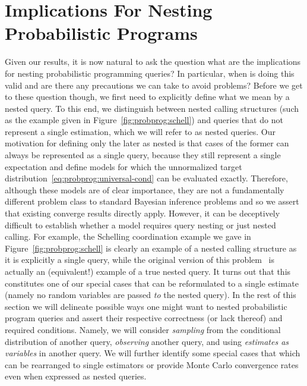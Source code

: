
\section{Implications For Nesting Probabilistic Programs}
\label{sec:nest:imp}

Given our results, it is now natural to ask the question what are the implications
for nesting probabilistic programming queries?  In particular, when is doing
this valid and are there any precautions we can take to avoid problems?  Before
we get to these question though, we first need to explicitly define what we
mean by a nested query.  To this end, we distinguish between nested calling
structures (such as the example given in Figure~\ref{fig:probprog:schell}) and
queries that do not represent a single estimation, which we will refer
to as nested queries. Our motivation for defining only the later
as nested is that cases of the former can always be represented as a single
query, because they still represent a single expectation and define models
for which the unnormalized target distribution~\eqref{eq:probprog:universal-cond}
 can be evaluated exactly.  Therefore, although these models are
of clear importance, they are not a fundamentally different problem class
to standard Bayesian inference problems and so we assert that existing \mc
converge results directly apply.  However, it can be deceptively difficult to establish
whether a model requires query nesting or just nested calling.
For example, the Schelling coordination example we gave in Figure~\ref{fig:probprog:schell}
is clearly an example of a nested calling structure as it is explicitly a single query,
while the original version of this problem~\cite[Figure 6]{stuhlmuller2014reasoning}
is actually an (equivalent!) example of a true nested query.  It turns out that this
constitutes one of our special cases that can be reformulated to a single estimate (namely
no random variables are passed \emph{to} the nested query).
In the rest of this section we will delineate possible ways one might want
to nested probabilistic program queries and
assert their respective correctness (or lack thereof) and required conditions.
Namely, we will consider \emph{sampling} from the conditional distribution
of another query, \emph{observing} another query, and using \emph{estimates as variables}
in another query.  We will further identify some special cases that which can be rearranged to single estimators or
provide Monte Carlo convergence rates even when expressed as nested queries.

